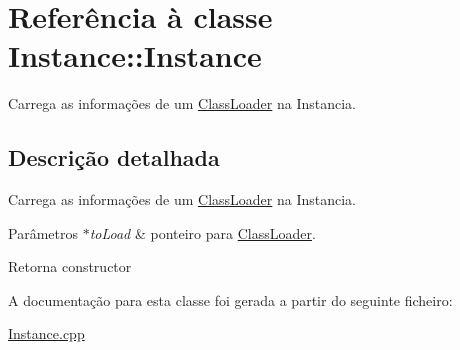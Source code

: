 \hypertarget{class_instance_1_1_instance}{}\section{Referência à classe Instance\+:\+:Instance}
\label{class_instance_1_1_instance}


Carrega as informações de um \hyperlink{class_class_loader}{Class\+Loader} na Instancia.  




\subsection{Descrição detalhada}
Carrega as informações de um \hyperlink{class_class_loader}{Class\+Loader} na Instancia. 


\begin{DoxyParams}{Parâmetros}
{\em $\ast$to\+Load} & ponteiro para \hyperlink{class_class_loader}{Class\+Loader}. \\
\hline
\end{DoxyParams}
\begin{DoxyReturn}{Retorna}
constructor 
\end{DoxyReturn}


A documentação para esta classe foi gerada a partir do seguinte ficheiro\+:\begin{DoxyCompactItemize}
\item 
\hyperlink{_instance_8cpp}{Instance.\+cpp}\end{DoxyCompactItemize}
